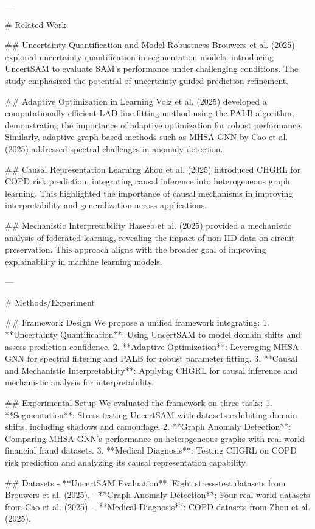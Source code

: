 ---

# Related Work

## Uncertainty Quantification and Model Robustness
Brouwers et al. (2025) explored uncertainty quantification in segmentation models, introducing UncertSAM to evaluate SAM's performance under challenging conditions. The study emphasized the potential of uncertainty-guided prediction refinement.

## Adaptive Optimization in Learning
Volz et al. (2025) developed a computationally efficient LAD line fitting method using the PALB algorithm, demonstrating the importance of adaptive optimization for robust performance. Similarly, adaptive graph-based methods such as MHSA-GNN by Cao et al. (2025) addressed spectral challenges in anomaly detection.

## Causal Representation Learning
Zhou et al. (2025) introduced CHGRL for COPD risk prediction, integrating causal inference into heterogeneous graph learning. This highlighted the importance of causal mechanisms in improving interpretability and generalization across applications.

## Mechanistic Interpretability
Haseeb et al. (2025) provided a mechanistic analysis of federated learning, revealing the impact of non-IID data on circuit preservation. This approach aligns with the broader goal of improving explainability in machine learning models.

---

# Methods/Experiment

## Framework Design
We propose a unified framework integrating:
1. **Uncertainty Quantification**: Using UncertSAM to model domain shifts and assess prediction confidence.
2. **Adaptive Optimization**: Leveraging MHSA-GNN for spectral filtering and PALB for robust parameter fitting.
3. **Causal and Mechanistic Interpretability**: Applying CHGRL for causal inference and mechanistic analysis for interpretability.

## Experimental Setup
We evaluated the framework on three tasks:
1. **Segmentation**: Stress-testing UncertSAM with datasets exhibiting domain shifts, including shadows and camouflage.
2. **Graph Anomaly Detection**: Comparing MHSA-GNN's performance on heterogeneous graphs with real-world financial fraud datasets.
3. **Medical Diagnosis**: Testing CHGRL on COPD risk prediction and analyzing its causal representation capability.

## Datasets
- **UncertSAM Evaluation**: Eight stress-test datasets from Brouwers et al. (2025).
- **Graph Anomaly Detection**: Four real-world datasets from Cao et al. (2025).
- **Medical Diagnosis**: COPD datasets from Zhou et al. (2025).

